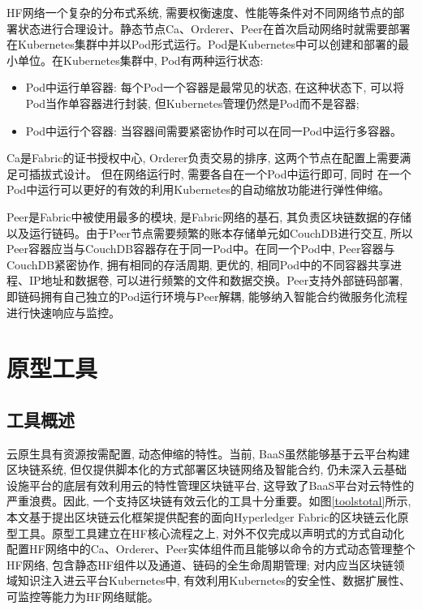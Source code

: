 HF网络一个复杂的分布式系统, 需要权衡速度、性能等条件对不同网络节点的部署状态进行合理设计。静态节点Ca、Orderer、Peer在首次启动网络时就需要部署在Kubernetes集群中并以Pod形式运行。Pod是Kubernetes中可以创建和部署的最小单位。在Kubernetes集群中, Pod有两种运行状态:

\begin{itemize}[itemindent=2em]
    \item Pod中运行单容器: 每个Pod一个容器是最常见的状态, 在这种状态下, 可以将Pod当作单容器进行封装, 但Kubernetes管理仍然是Pod而不是容器;

    \item Pod中运行个容器: 当容器间需要紧密协作时可以在同一Pod中运行多容器。
\end{itemize}

Ca是Fabric的证书授权中心, Orderer负责交易的排序, 这两个节点在配置上需要满足可插拔式设计。 但在网络运行时, 需要各自在一个Pod中运行即可, 同时 在一个Pod中运行可以更好的有效的利用Kubernetes的自动缩放功能进行弹性伸缩。

Peer是Fabric中被使用最多的模块, 是Fabric网络的基石, 其负责区块链数据的存储以及运行链码。由于Peer节点需要频繁的账本存储单元如CouchDB进行交互, 所以Peer容器应当与CouchDB容器存在于同一Pod中。在同一个Pod中, Peer容器与CouchDB紧密协作, 拥有相同的存活周期, 更优的, 相同Pod中的不同容器共享进程、IP地址和数据卷, 可以进行频繁的文件和数据交换。Peer支持外部链码部署, 即链码拥有自己独立的Pod运行环境与Peer解耦, 能够纳入智能合约微服务化流程\cite{zhangfuli2021smartcontract}进行快速响应与监控。 

\section{原型工具}

\subsection{工具概述}

云原生具有资源按需配置, 动态伸缩的特性。当前, BaaS虽然能够基于云平台构建区块链系统, 但仅提供脚本化的方式部署区块链网络及智能合约, 仍未深入云基础设施平台的底层有效利用云的特性管理区块链平台, 这导致了BaaS平台对云特性的严重浪费。因此, 一个支持区块链有效云化的工具十分重要。如图\ref{toolstotal}所示, 本文基于提出区块链云化框架提供配套的面向Hyperledger Fabric的区块链云化原型工具。原型工具建立在HF核心流程之上, 对外不仅完成以声明式的方式自动化配置HF网络中的Ca、Orderer、Peer实体组件而且能够以命令的方式动态管理整个HF网络, 包含静态HF组件以及通道、链码的全生命周期管理; 对内应当区块链领域知识注入进云平台Kubernetes中, 有效利用Kubernetes的安全性、数据扩展性、可监控等能力为HF网络赋能。

